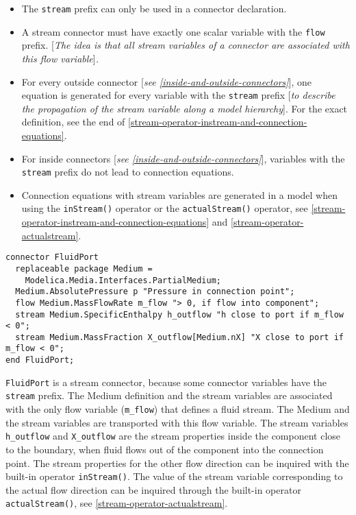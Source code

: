 \begin{itemize}
\item
  The \lstinline!stream! prefix can only be used in a connector
  declaration.
\item
  A stream connector must have exactly one scalar variable with the
  \lstinline!flow! prefix. {[}\emph{The idea is that all stream variables
  of a connector are associated with this flow variable}{]}\emph{.}
\item
  For every outside connector {[}\emph{see \autoref{inside-and-outside-connectors}}{]}, one
  equation is generated for every variable with the \lstinline!stream!
  prefix {[}\emph{to describe the propagation of the stream variable
  along a model hierarchy}{]}. For the exact definition, see the end of
  \autoref{stream-operator-instream-and-connection-equations}.
\item
  For inside connectors {[}\emph{see \autoref{inside-and-outside-connectors}}{]}, variables
  with the \lstinline!stream! prefix do not lead to connection equations.
\item
  Connection equations with stream variables are generated in a model
  when using the \lstinline!inStream()! operator or the
  \lstinline!actualStream()! operator, see \autoref{stream-operator-instream-and-connection-equations}
  and \autoref{stream-operator-actualstream}.
\end{itemize}

\begin{example}
\begin{lstlisting}[language=modelica]
connector FluidPort
  replaceable package Medium =
    Modelica.Media.Interfaces.PartialMedium;
  Medium.AbsolutePressure p "Pressure in connection point";
  flow Medium.MassFlowRate m_flow "> 0, if flow into component";
  stream Medium.SpecificEnthalpy h_outflow "h close to port if m_flow < 0";
  stream Medium.MassFraction X_outflow[Medium.nX] "X close to port if m_flow < 0";
end FluidPort;
\end{lstlisting}
\lstinline!FluidPort! is a stream connector, because some connector variables
have the \lstinline!stream! prefix. The Medium definition and the stream
variables are associated with the only flow variable (\lstinline!m_flow!) that
defines a fluid stream. The Medium and the stream variables are
transported with this flow variable. The stream variables \lstinline!h_outflow! and
\lstinline!X_outflow! are the stream properties inside the component close to the
boundary, when fluid flows out of the component into the connection
point. The stream properties for the other flow direction can be
inquired with the built-in operator \lstinline!inStream()!. The value of
the stream variable corresponding to the actual flow direction can be
inquired through the built-in operator \lstinline!actualStream()!, see
\autoref{stream-operator-actualstream}.
\end{example}

